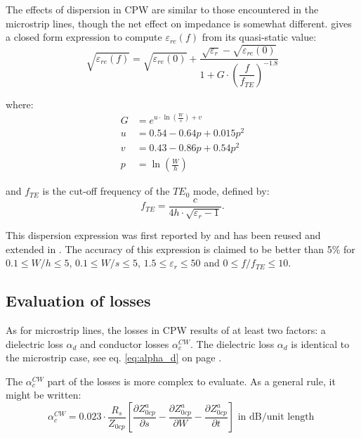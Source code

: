 The effects of dispersion in CPW are similar to those encountered in
the microstrip lines, though the net effect on impedance is somewhat
different.  \cite{Gupta1} gives a closed form expression to compute
$\varepsilon_{re}(f)$ from its quasi-static value:
\begin{equation}
\sqrt{\varepsilon_{re}(f)}=\sqrt{\varepsilon_{re}(0)} + \dfrac{\sqrt{\varepsilon_r} - \sqrt{\varepsilon_{re}(0)}}{1+G\cdot\left(\dfrac{f}{f_{TE}}\right)^{-1.8}}
\end{equation}

where:
\begin{align}
G &= e^{u\cdot \ln\left(\tfrac{W}{s}\right)+v}\\
u &= 0.54 - 0.64p + 0.015p^2\\
v &= 0.43-0.86p+0.54p^2\\
p &= \ln\left(\tfrac{W}{h}\right)
\end{align}

and $f_{TE}$ is the cut-off frequency of the ${TE}_{0}$ mode, defined by:
\begin{equation}
f_{TE} = \dfrac{c}{4h\cdot\sqrt{\varepsilon_r - 1}}.
\end{equation}

This dispersion expression was first reported by \cite{Frankel} and
has been reused and extended in \cite{Gevorgian}.  The accuracy of
this expression is claimed to be better than 5\% for $0.1 \le W/h \le
5$, $0.1 \le W/s \le 5$, $1.5 \le \varepsilon_r \le 50$ and $0 \le
f/f_{TE} \le 10$.

\subsection{Evaluation of losses}

As for microstrip lines, the losses in CPW results of at least two
factors: a dielectric loss $\alpha_d$ and conductor losses
$\alpha_c^{CW}$.  The dielectric loss $\alpha_d$ is identical to the
microstrip case, see eq. \eqref{eq:alpha_d} on page
\pageref{eq:alpha_d}.

\addvspace{12pt}

The $\alpha_c^{CW}$ part of the losses is more complex to evaluate.  As
a general rule, it might be written:
\begin{equation}
\alpha_c^{CW} = 0.023\cdot \dfrac{R_s}{Z_{0cp}}\left[\dfrac{\partial Z^a_{0cp}}{\partial s} - \dfrac{\partial Z^a_{0cp}}{\partial W} - \dfrac{\partial Z^a_{0cp}}{\partial t}\right]
\textrm{ in dB/unit length }
\end{equation}

